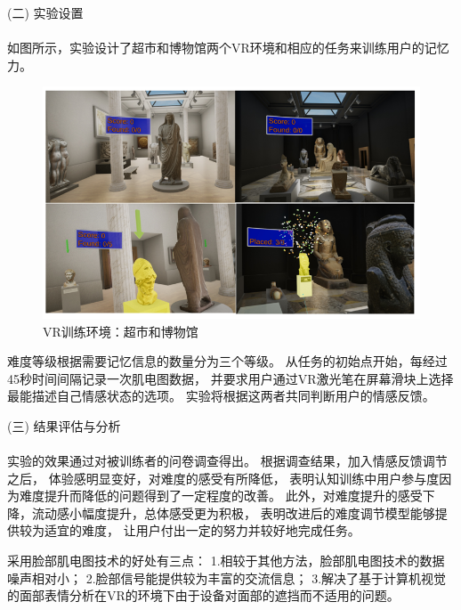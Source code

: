 \documentclass{article}
\begin{document}
            (二) 实验设置\paragraph{}
            如图所示，实验设计了超市和博物馆两个VR环境和相应的任务来训练用户的记忆力。
            \begin{figure}[H]
            	
            	\centering
            	\includegraphics[scale=0.8]{images/VR.png}
            	\caption{VR训练环境：超市和博物馆\cite{ref15}}
            	\label{fig:label}
            \end{figure}
            难度等级根据需要记忆信息的数量分为三个等级。
            从任务的初始点开始，每经过45秒时间间隔记录一次肌电图数据，
            并要求用户通过VR激光笔在屏幕滑块上选择最能描述自己情感状态的选项。
            实验将根据这两者共同判断用户的情感反馈。

            (三) 结果评估与分析\paragraph{}
            实验的效果通过对被训练者的问卷调查得出。
            根据调查结果，加入情感反馈调节之后，
            体验感明显变好，对难度的感受有所降低，
            表明认知训练中用户参与度因为难度提升而降低的问题得到了一定程度的改善。
            此外，对难度提升的感受下降，流动感小幅度提升，总体感受更为积极，
            表明改进后的难度调节模型能够提供较为适宜的难度，
            让用户付出一定的努力并较好地完成任务。

            采用脸部肌电图技术的好处有三点：
            1.相较于其他方法，脸部肌电图技术的数据噪声相对小；
            2.脸部信号能提供较为丰富的交流信息；
            3.解决了基于计算机视觉的面部表情分析在VR的环境下由于设备对面部的遮挡而不适用的问题。
\end{document}

